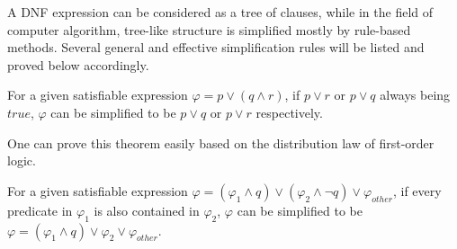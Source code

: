 A DNF expression can be considered as a tree of clauses, while in the field of computer algorithm, tree-like structure is simplified mostly by rule-based methods. Several general and effective simplification rules will be listed and proved below accordingly.

\begin{theorem}
For a given satisfiable expression $\varphi = p \vee (q \wedge r)$, if $p \vee r$ or $p \vee q$ always being $true$, $\varphi$ can be simplified to be $p \vee q$ or $p \vee r$ respectively.
\end{theorem}
One can prove this theorem easily based on the distribution law of first-order logic.

\begin{theorem}
For a given satisfiable expression $\varphi = (\varphi _{1} \wedge q) \vee (\varphi _{2} \wedge \neg q) \vee \varphi _{other}$, if every predicate in $\varphi _{1}$ is also contained in $\varphi _{2}$,
$\varphi$ can be simplified to be $\varphi = (\varphi _{1} \wedge q) \vee \varphi _{2} \vee \varphi _{other}$.
\end{theorem}
